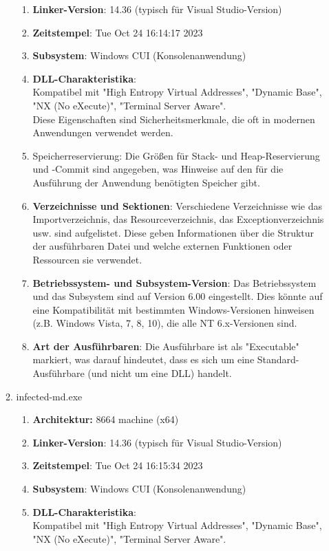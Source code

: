 \documentclass{article}
\begin{document}
\begin{enumerate}
\begin{enumerate}
\begin{enumerate}
				\item \textbf{Linker-Version}: 14.36 (typisch für Visual Studio-Version)
				\item \textbf{Zeitstempel}: Tue Oct 24 16:14:17 2023
				\item \textbf{Subsystem}: Windows CUI (Konsolenanwendung)
				\item \textbf{DLL-Charakteristika}:\\
				Kompatibel mit "High Entropy Virtual Addresses", "Dynamic Base", "NX (No eXecute)", "Terminal Server Aware".\\
				Diese Eigenschaften sind Sicherheitsmerkmale, die oft in modernen Anwendungen verwendet werden.
				\item Speicherreservierung: Die Größen für Stack- und Heap-Reservierung und -Commit sind angegeben, was Hinweise auf den für die Ausführung der Anwendung benötigten Speicher gibt.
				\item \textbf{Verzeichnisse und Sektionen}: Verschiedene Verzeichnisse wie das Importverzeichnis, das Resourceverzeichnis, das Exceptionverzeichnis usw. sind aufgelistet. Diese geben Informationen über die Struktur der ausführbaren Datei und welche externen Funktionen oder Ressourcen sie verwendet.
				\item \textbf{Betriebssystem- und Subsystem-Version}: Das Betriebssystem und das Subsystem sind auf Version 6.00 eingestellt. Dies könnte auf eine Kompatibilität mit bestimmten Windows-Versionen hinweisen (z.B. Windows Vista, 7, 8, 10), die alle NT 6.x-Versionen sind.
				\item \textbf{Art der Ausführbaren}: Die Ausführbare ist als "Executable" markiert, was darauf hindeutet, dass es sich um eine Standard-Ausführbare (und nicht um eine DLL) handelt.
			\end{enumerate}
			\item infected-md.exe
			\begin{enumerate}
				\item \textbf{Architektur:} 8664 machine (x64)
				\item \textbf{Linker-Version}: 14.36 (typisch für Visual Studio-Version)
				\item \textbf{Zeitstempel}: Tue Oct 24 16:15:34 2023
				\item \textbf{Subsystem}: Windows CUI (Konsolenanwendung)
				\item \textbf{DLL-Charakteristika}:\\
				Kompatibel mit "High Entropy Virtual Addresses", "Dynamic Base", "NX (No eXecute)", "Terminal Server Aware".\\

\end{enumerate}
\end{enumerate}
\end{enumerate}
\end{document}
